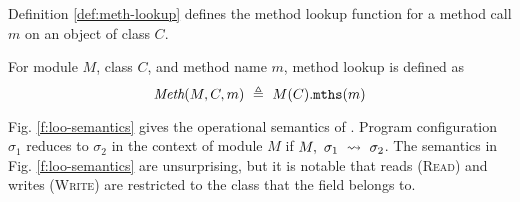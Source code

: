 Definition \ref{def:meth-lookup} defines the method lookup function for a method
call $m$ on an object of class $C$.
\begin{definition}
\label{def:meth-lookup}
For module $M$, class $C$, and method name $m$, method lookup is defined as 
$$\meth{M}{C}{m}\ \triangleq\ M(C).\texttt{mths}(m)$$
\end{definition}

Fig. \ref{f:loo-semantics} gives the operational semantics of \Loo. 
Program configuration $\sigma_1$ reduces to $\sigma_2$ in the context of
module $M$ if $M,\ \sigma_1\ \leadsto\ \sigma_2$. The semantics in Fig. \ref{f:loo-semantics}
are unsurprising, but it is notable that reads (\textsc{Read}) and writes (\textsc{Write})
are restricted to the class that the field belongs to.
\begin{figure}[t]
\begin{minipage}{\textwidth}
\begin{minipage}{\textwidth}
\footnotesize
{}
\end{minipage}
\end{minipage}
\end{figure}
